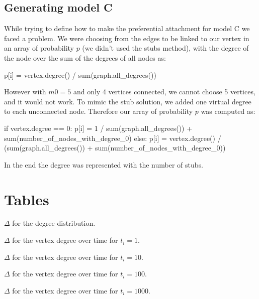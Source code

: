 \documentclass[a4paper]{article}
\begin{document}
\subsection{Generating model C}

While trying to define how to make the preferential attachment for model C we
faced a problem. We were choosing from the edges to be linked to our vertex in
an array of probability $p$ (we didn't used the stubs method), with the degree 
of the node over the sum of the degrees of all nodes as:
%
\begin{pycode}
p[i] = vertex.degree() / sum(graph.all_degrees())
\end{pycode}
%
However with $m0 = 5$ and only 4 vertices  connected, we cannot choose 5 
vertices, and it would not work. To mimic the stub solution, we added one 
virtual degree to each unconnected node. Therefore our array of probability $p$ 
was computed as:

\begin{pycode}
if vertex.degree == 0:
	p[i] = 1 / sum(graph.all_degrees()) + sum(number_of_nodes_with_degree_0)
else:
	p[i] = vertex.degree() / (sum(graph.all_degrees()) +
		sum(number_of_nodes_with_degree_0))
\end{pycode}

In the end the degree was represented with the number of stubs.

\appendix
\section{Tables}


\begin{table}[H]
	\centering
	
	\caption{$\Delta$ for the degree distribution.}
	\label{tab:AICdd}
\end{table}
\begin{table}[H]
	\centering
	
	\caption{$\Delta$ for the vertex degree over time for $t_i = 1$.}
	\label{tab:AICdt1}
\end{table}
\begin{table}[H]
	\centering
	
	\caption{$\Delta$ for the vertex degree over time for $t_i = 10$.}
	\label{tab:AICdt10}
\end{table}
\begin{table}[H]
	\centering
	
	\caption{$\Delta$ for the vertex degree over time for $t_i = 100$.}
	\label{tab:AICdt100}
\end{table}
\begin{table}[H]
	\centering
	
	\caption{$\Delta$ for the vertex degree over time for $t_i = 1000$.}
	\label{tab:AICdt1000}
\end{table}
\end{document}
